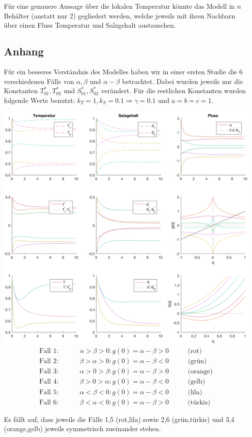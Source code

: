 \documentclass[11pt,a4paper]{article}
\begin{document}
	Für eine genauere Aussage über die lokalen Temperatur könnte das Modell in \(n\) Behälter (anstatt nur 2) gegliedert werden, welche jeweils mit ihren Nachbarn über einen Fluss Temperatur und Salzgehalt austauschen.
	
	\newpage
	\subsection*{Anhang}
	
	Für ein besseres Verständnis des Modelles haben wir in einer ersten Studie die 6 verschiedenen Fälle von \(\alpha, \beta \) und \(\alpha - \beta\) betrachtet. Dabei wurden jeweils nur die Konstanten \(T^*_{01}, T^*_{02}\) und \(S^*_{01}, S^*_{02}\) verändert. Für die restlichen Konstanten wurden folgende Werte benutzt: \(k_T = 1, k_S = 0.1 \Rightarrow \gamma = 0.1\) und \(a = b = c = 1 \). 
	
	\begin{center}
	\includegraphics[width=14cm]{Diagramme/Fallstudie.png}
	\begin{align*}
		\textrm{Fall 1: } &\qquad \alpha > \beta > 0: g(0) = \alpha - \beta > 0 &\qquad \textrm{(rot)} \\
		\textrm{Fall 2: } &\qquad \beta > \alpha > 0: g(0) = \alpha - \beta < 0 &\qquad \textrm{(grün)} \\
		\textrm{Fall 3: } &\qquad \alpha > 0 > \beta: g(0) = \alpha - \beta > 0 &\qquad \textrm{(orange)} \\
		\textrm{Fall 4: } &\qquad \beta > 0 > \alpha: g(0) = \alpha - \beta < 0 &\qquad \textrm{(gelb)} \\
		\textrm{Fall 5: } &\qquad \alpha < \beta < 0: g(0) = \alpha - \beta < 0 &\qquad \textrm{(lila)} \\
		\textrm{Fall 6: } &\qquad \beta < \alpha < 0: g(0) = \alpha - \beta > 0 &\qquad \textrm{(türkis)}
	\end{align*}
	\end{center}		
	
	Es fällt auf, dass jeweils die Fälle 1,5 (rot,lila) sowie 2,6 (grün,türkis) und 3,4 (orange,gelb) jeweils symmetrisch zueinander stehen.
	
\end{document}

